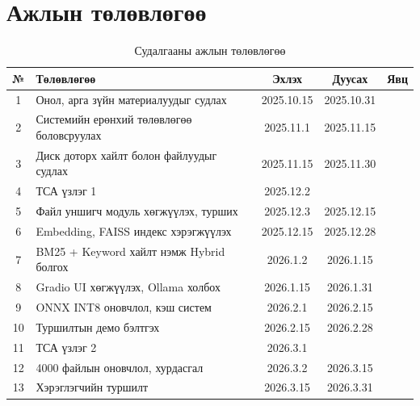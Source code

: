 \documentclass[11pt,a4paper]{article}
\begin{document}
\newpage
{}
\listoffigures

\newpage
{}

\section{Ажлын төлөвлөгөө}

\begin{table}[H]
\centering
\caption{Судалгааны ажлын төлөвлөгөө}
\label{tab:schedule}
\small
\begin{tabularx}{\textwidth}{|c|X|c|c|c|}
\hline
№ & Төлөвлөгөө & Эхлэх & Дуусах & Явц \\
\hline
1  & Онол, арга зүйн материалуудыг судлах                    & 2025.10.15 & 2025.10.31 & \\
\hline
2  & Системийн ерөнхий төлөвлөгөө боловсруулах               & 2025.11.1  & 2025.11.15 & \\
\hline
3  & Диск доторх хайлт болон файлуудыг судлах                & 2025.11.15 & 2025.11.30 & \\
\hline
4  & ТСА үзлэг 1                                              & 2025.12.2  &            & \\
\hline
5  & Файл уншигч модуль хөгжүүлэх, турших                    & 2025.12.3  & 2025.12.15 & \\
\hline
6  & Embedding, FAISS индекс хэрэгжүүлэх                     & 2025.12.15 & 2025.12.28 & \\
\hline
7  & BM25 + Keyword хайлт нэмж Hybrid болгох                 & 2026.1.2   & 2026.1.15  & \\
\hline
8  & Gradio UI хөгжүүлэх, Ollama холбох                      & 2026.1.15  & 2026.1.31  & \\
\hline
9  & ONNX INT8 оновчлол, кэш систем                           & 2026.2.1   & 2026.2.15  & \\
\hline
10 & Туршилтын демо бэлтгэх                                   & 2026.2.15  & 2026.2.28  & \\
\hline
11 & ТСА үзлэг 2                                              & 2026.3.1   &            & \\
\hline
12 & 4000 файлын оновчлол, хурдасгал                          & 2026.3.2   & 2026.3.15  & \\
\hline
13 & Хэрэглэгчийн туршилт                                     & 2026.3.15  & 2026.3.31  & \\

\end{tabularx}
\end{table}
\end{document}
